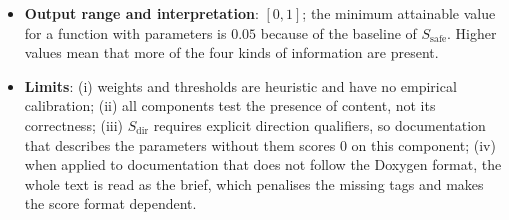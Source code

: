 \begin{itemize}[leftmargin=*, label=\textbullet]
	\item \textbf{Output range and interpretation}: $[0,1]$; the minimum attainable value for a
	function with parameters is $0.05$ because of the baseline of $S_{\mathrm{safe}}$. Higher values
	mean that more of the four kinds of information are present.

	\item \textbf{Limits}: (i) weights and thresholds are heuristic and have no empirical calibration;
	(ii) all components test the presence of content, not its correctness; (iii) $S_{\mathrm{dir}}$
	requires explicit direction qualifiers, so documentation that describes the parameters without
	them scores $0$ on this component; (iv) when applied to documentation that does not follow the
	Doxygen format, the whole text is read as the brief, which penalises the missing tags and makes
	the score format dependent.
\end{itemize}

